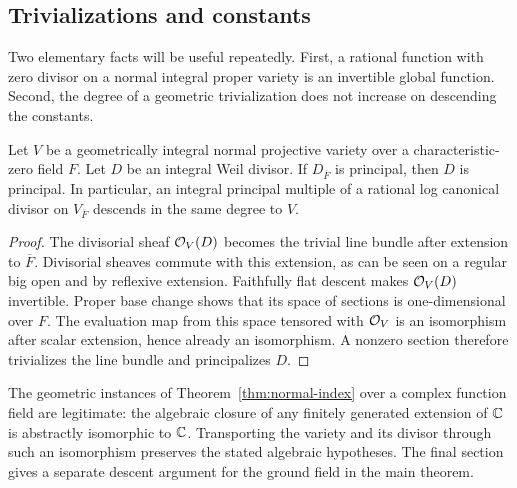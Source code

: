 \subsection{Trivializations and constants}

Two elementary facts will be useful repeatedly. First, a rational
function with zero divisor on a normal integral proper variety is an
invertible global function. Second, the degree of a geometric
trivialization does not increase on descending the constants.

\begin{lemma}\label{lem:trivialization-descent}
Let $V$ be a geometrically integral normal projective variety over a
characteristic-zero field $F$. Let $D$ be an integral Weil divisor.
If $D_{\overline F}$ is principal, then $D$ is principal.
In particular, an integral principal multiple of a rational log
canonical divisor on $V_{\overline F}$ descends in the same degree to $V$.
\end{lemma}
\begin{proof}
The divisorial sheaf $\mathcal O_V(D)$ becomes the trivial line bundle after
extension to $\overline F$. Divisorial sheaves commute with this extension,
as can be seen on a regular big open and by reflexive extension.
Faithfully flat descent makes $\mathcal O_V(D)$ invertible.
Proper base change shows that its space of sections is one-dimensional
over $F$. The evaluation map from this space tensored with $\mathcal O_V$
is an isomorphism after scalar extension, hence already an isomorphism.
A nonzero section therefore trivializes the line bundle and principalizes
$D$.
\end{proof}

The geometric instances of Theorem~\ref{thm:normal-index} over a complex
function field are legitimate: the algebraic closure of any finitely
generated extension of $\mathbb C$ is abstractly isomorphic to $\mathbb C$.
Transporting the variety and its divisor through such an isomorphism
preserves the stated algebraic hypotheses. The final section gives
a separate descent argument for the ground field in the main theorem.
